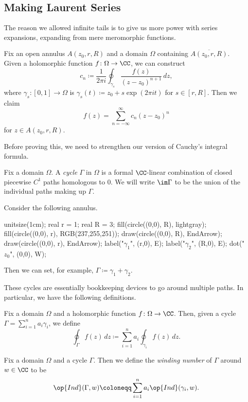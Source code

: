 \documentclass[../notes.tex]{subfiles}
\begin{document}
\subsection{Making Laurent Series}
The reason we allowed infinite tails is to give us more power with series expansions, expanding from mere meromorphic functions.
\begin{theorem} \label{thm:laurent}
	Fix an open annulus $A(z_0,r,R)$ and a domain $\Omega$ containing $\overline{A(z_0,r,R)}$. Given a holomorphic function $f\colon\Omega\to\CC$, we can construct
	\[c_n\coloneqq\frac1{2\pi i}\oint_{\gamma_s}\frac{f(z)}{(z-z_0)^{n+1}}\,dz,\]
	where $\gamma_s\colon[0,1]\to\Omega$ is $\gamma_s(t)\coloneqq z_0+s\exp(2\pi it)$ for $s\in[r,R]$. Then we claim
	\[f(z)=\sum_{n=-\infty}^\infty c_n(z-z_0)^n\]
	for $z\in A(z_0,r,R)$.
\end{theorem}
Before proving this, we need to strengthen our version of Cauchy's integral formula.
\begin{definition}[Cycles]
	Fix a domain $\Omega$. A \textit{cycle} $\Gamma$ in $\Omega$ is a formal $\CC$-linear combination of closed piecewise $C^1$ paths homologous to $0$. We will write $\im\Gamma$ to be the union of the individual paths making up $\Gamma$.
\end{definition}
\begin{example} \label{ex:annuluscycle}
	Consider the following annulus.
	\begin{center}
		\begin{asy}
			unitsize(1cm);
			real r = 1;
			real R = 3;
			fill(circle((0,0), R), lightgray);
			fill(circle((0,0), r), RGB(237,255,251));
			draw(circle((0,0), R), EndArrow);
			draw(circle((0,0), r), EndArrow);
			label("$\gamma_1$", (r,0), E);
			label("$\gamma_2$", (R,0), E);
			dot("$z_0$", (0,0), W);
		\end{asy}
	\end{center}
	Then we can set, for example, $\Gamma\coloneqq\gamma_1+\gamma_2$.
\end{example}
These cycles are essentially bookkeeping devices to go around multiple paths. In particular, we have the following definitions.
\begin{definition}
	Fix a domain $\Omega$ and a holomorphic function $f\colon\Omega\to\CC$. Then, given a cycle $\Gamma=\sum_{i=1}^na_i\gamma_i$, we define
	\[\oint_\Gamma f(z)\,dz\coloneqq\sum_{i=1}^na_i\oint_{\gamma_i}f(z)\,dz.\]
\end{definition}
\begin{definition}
	Fix a domain $\Omega$ and a cycle $\Gamma$. Then we define the \textit{winding number} of $\Gamma$ around $w\in\CC$ to be
	\[\op{Ind}(\Gamma,w)\coloneqq\sum_{i=1}^na_i\op{Ind}(\gamma_i,w).\]
\end{definition}
\end{document}
